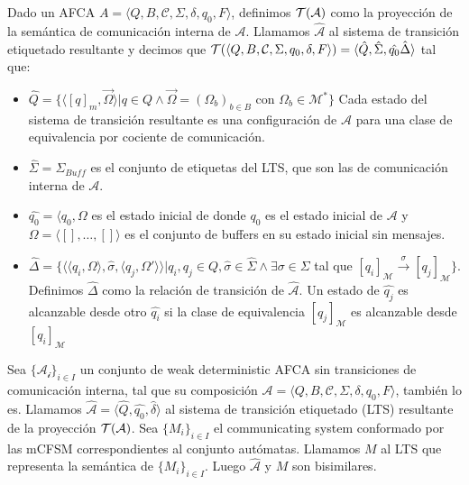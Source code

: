\begin{definition}\label{def:pci}
Dado un AFCA $A = \langle Q, B, \mathcal{C}, \Sigma, \delta, q_0, F \rangle$, definimos $\mathcal{T}(\mathcal{A})$ como la proyección de la semántica de comunicación interna de $\mathcal{A}$. Llamamos $\hat{\mathcal{A}}$ al sistema de transición etiquetado resultante y decimos que $\mathcal{T} (\langle Q, B, \mathcal{C}, \Sigma, q_0, \delta, F \rangle)= \langle \hat{Q}, \hat{\Sigma}, \hat{q_0} \hat{\Delta} \rangle$ tal que:
\begin{itemize}
    \item $ \hat{Q} = \{ \langle [q]_m, \overrightarrow{\Omega} \rangle | q \in Q \land \overrightarrow{\Omega} = (\Omega_b)_{b \in B}$ con $\Omega_b \in \mathcal{M}^* \}$ Cada estado del sistema de transición resultante es una configuración de $\mathcal{A}$ para una clase de equivalencia por cociente de comunicación.
    
    \item $\hat{\Sigma} = \Sigma_{Buff} $ es el conjunto de etiquetas del LTS, que son las de comunicación interna de $\mathcal{A}$.
    
    \item $\hat{q_0}= \langle q_0, \Omega$ es el estado inicial de  donde $q_0$ es el estado inicial de $\mathcal{A}$ y $\Omega = \langle [], \ldots, [] \rangle$ es el conjunto de buffers en su estado inicial sin mensajes.
    
    \item $\hat{\Delta}= \{\langle \langle q_i, \Omega \rangle, \hat{\sigma},\langle q_j, \Omega' \rangle \rangle | q_i,q_j \in Q, \hat{\sigma} \in \hat{\Sigma} \land \exists \sigma \in \Sigma$ tal que  $[q_i]_\mathcal{M} \xrightarrow{\sigma} [q_j]_\mathcal{M} \}$. Definimos $\hat{\Delta}$ como la relación de transición de $\hat{\mathcal{A}}$. Un estado de $\hat{q_j}$ es alcanzable desde otro $\hat{q_i}$ si la clase de equivalencia $[q_j]_\mathcal{M}$ es alcanzable desde $[q_i]_\mathcal{M}$
    
\end{itemize}
\end{definition}

\begin{theorem} Sea $\{\mathcal{A_i}\}_{i \in I}$ un conjunto de weak deterministic AFCA sin transiciones de comunicación interna, tal que su composición $\mathcal{A} = \langle Q, B, \mathcal{C},\Sigma, \delta, q_0, F \rangle$, también lo es. Llamamos $\hat{\mathcal{A}}=\langle \hat{Q}, \hat{q_0}, \hat{\delta} \rangle$ al sistema de transición etiquetado (LTS) resultante de la proyección $\mathcal{T}(\mathcal{A})$. Sea $\{M_i\}_{i \in I}$ el communicating system conformado por las mCFSM correspondientes al conjunto autómatas. Llamamos $M$ al LTS que representa la semántica de $\{M_i\}_{i \in I}$. Luego $\hat{\mathcal{A}}$ y $M$ son bisimilares. 
\end{theorem}

